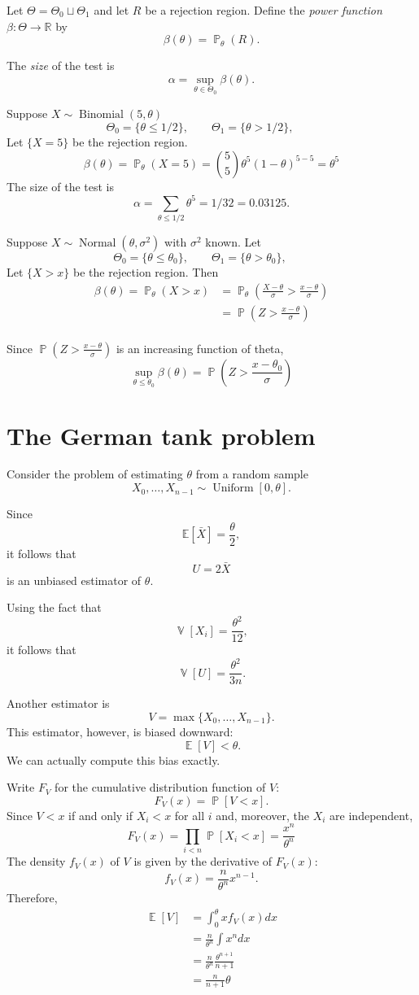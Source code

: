 \documentclass{amsart}
\newcommand{\RR}{\mathbb{R}}
\DeclareMathOperator{\Exp}{\mathbb{E}}
\DeclareMathOperator{\Var}{\mathbb{V}}
\DeclareMathOperator{\Prob}{\mathbb{P}}
\DeclareMathOperator{\Binomial}{Binomial}
\DeclareMathOperator{\Normal}{Normal}
\DeclareMathOperator{\Uniform}{Uniform}
\begin{document}
Let $\Theta = \Theta_0\sqcup \Theta_1$ and let $R$ be a rejection region.
Define the \emph{power function $\beta:\Theta\to\RR$} by
\[
\beta(\theta) = \Prob_\theta(R).
\]

The \emph{size} of the test is
\[
\alpha = \sup_{\theta\in\Theta_0}\beta(\theta).
\]

Suppose $X\sim\Binomial(5, \theta)$
\[
\Theta_0 = \{\theta \leq 1/2\},\qquad
\Theta_1 = \{\theta > 1/2\},\qquad
\]
Let $\{X = 5\}$ be the rejection region.
\[
\beta(\theta) = \Prob_\theta(X=5) = \binom{5}{5}\theta^5(1 - \theta)^{5 - 5} = \theta^5
\]
The size of the test is
\[
\alpha = \sum_{\theta \leq 1/2}\theta^5 = 1/32=0.03125.
\]

Suppose $X\sim \Normal(\theta,\sigma^2)$ with $\sigma^2$ known.
Let 
\[
\Theta_0 = \{\theta \leq \theta_0\},\qquad
\Theta_1 = \{\theta > \theta_0\},\qquad
\]
Let $\{X > x\}$ be the rejection region. Then
\begin{align*}
\beta(\theta) = \Prob_\theta(X > x)
&= \Prob_\theta\left(\frac{X - \theta}{\sigma} > \frac{x - \theta}{\sigma}\right)\\
&= \Prob\left(Z > \frac{x - \theta}{\sigma}\right)\\
\end{align*}

Since $\Prob\left(Z > \frac{x - \theta}{\sigma}\right)$ is an increasing function of theta,
\[
\sup_{\theta\leq \theta_0} \beta(\theta) = \Prob\left(Z > \frac{x - \theta_0}{\sigma}\right)
\]

\section{The German tank problem}

Consider the problem of estimating $\theta$ from a random sample 
\[
X_0,\ldots,X_{n-1}\sim \Uniform[0, \theta].
\]

Since
\[
\mathbb{E}[\bar{X}]=\frac\theta2,
\]
it follows that
\[
U = 2\bar{X}
\]
is an unbiased estimator of $\theta$.

Using the fact that
\[
\Var[X_i] = \frac{\theta^2}{12},
\]
it follows that
\[
\Var[U] = \frac{\theta^2}{3n}.
\]

Another estimator is
\[
V = \max\{X_0,\ldots,X_{n-1}\}.
\]
This estimator, however, is biased downward:
\[
\Exp[V] < \theta.
\]
We can actually compute this bias exactly.

Write $F_V$ for the cumulative distribution function of $V$:
\[
F_V(x) = \Prob[V < x].
\]
Since $V < x$ if and only if $X_i < x$ for all $i$ and, moreover, the $X_i$ are independent,
\[
F_V(x) = \prod_{i < n}\Prob[X_i < x] = \frac{x^n}{\theta^n}
\]
The density $f_V(x)$ of $V$ is given by the derivative of $F_V(x)$:
\[
f_V(x) = \frac{n}{\theta^n}x^{n - 1}.
\]
Therefore,
\begin{align*}
\Exp[V] &= \int_0^\theta x f_V(x)dx\\
&= \frac{n}{\theta^n}\int x^ndx\\
&= \frac{n}{\theta^n}\frac{\theta^{n + 1}}{n + 1}\\
&= \frac{n}{n+1}\theta
\end{align*}
\end{document}
